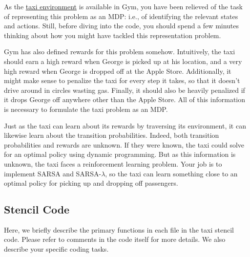 \documentclass{article}
\begin{document}
As the \href{https://gym.openai.com/envs/Taxi-v2/}{taxi environment}
is available in Gym, you have been relieved of the task of
representing this problem as an MDP: i.e., of identifying the relevant
states and actions.  Still, before diving into the code, you should
spend a few minutes thinking about how you might have tackled this
representation problem.

Gym has also defined rewards for this problem somehow.  Intuitively,
the taxi should earn a high reward when George is picked up at his
location, and a very high reward when George is dropped off at the
Apple Store.  Additionally, it might make sense to penalize the taxi
for every step it takes, so that it doesn't drive around in circles
wasting gas.  Finally, it should also be heavily penalized if it drops
George off
anywhere other than the Apple Store.  All of this information is
necessary to formulate the taxi problem as an MDP.

Just as the taxi can learn about its rewards by traversing its
environment, it can likewise learn about the transition probabilities.
Indeed, both transition probabilities and rewards are unknown.  If they
were known, the taxi could solve for an optimal policy using dynamic
programming.  But as this information is unknown, the taxi faces a
reinforcement learning problem.  Your job is to implement SARSA and
SARSA-$\lambda$, so the taxi can learn something close to an optimal
policy for picking up and dropping off passengers.


\subsection{Stencil Code}
Here, we briefly describe the primary functions in each file in the
taxi stencil code.  Please refer to comments in the code itself for
more details.  We also describe your specific coding tasks.
\end{document}
